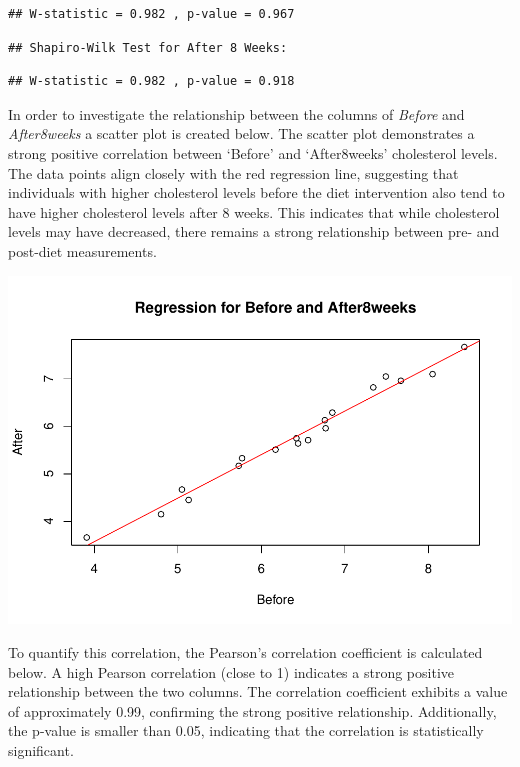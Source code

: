 \documentclass[
  11pt,
]{article}
\begin{document}
\begin{verbatim}
## W-statistic = 0.982 , p-value = 0.967
\end{verbatim}

\begin{verbatim}
## Shapiro-Wilk Test for After 8 Weeks:
\end{verbatim}

\begin{verbatim}
## W-statistic = 0.982 , p-value = 0.918
\end{verbatim}

In order to investigate the relationship between the columns of
\emph{Before} and \emph{After8weeks} a scatter plot is created below.
The scatter plot demonstrates a strong positive correlation between
`Before' and `After8weeks' cholesterol levels. The data points align
closely with the red regression line, suggesting that individuals with
higher cholesterol levels before the diet intervention also tend to have
higher cholesterol levels after 8 weeks. This indicates that while
cholesterol levels may have decreased, there remains a strong
relationship between pre- and post-diet measurements.

\includegraphics{ReportAssignment1_files/figure-latex/unnamed-chunk-7-1.pdf}

To quantify this correlation, the Pearson's correlation coefficient is
calculated below. A high Pearson correlation (close to 1) indicates a
strong positive relationship between the two columns. The correlation
coefficient exhibits a value of approximately 0.99, confirming the
strong positive relationship. Additionally, the p-value is smaller than
0.05, indicating that the correlation is statistically significant.
\end{document}
